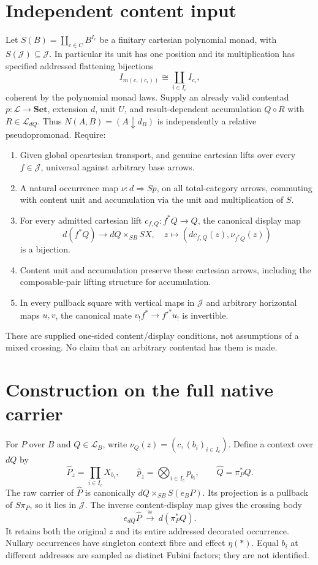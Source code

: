 \documentclass[11pt]{article}
\begin{document}
\section{Independent content input}
Let $S(B)=\coprod_{c\in C} B^{I_c}$ be a finitary cartesian polynomial monad, with $S(\mathcal J)\subseteq\mathcal J$. In particular its unit has one position and its multiplication has specified addressed flattening bijections
\[
 I_{m(c,(c_i))}\cong\coprod_{i\in I_c} I_{c_i},
\]
coherent by the polynomial monad laws. Supply an already valid contentad $p:\mathcal L\to\mathbf{Set}$, extension $d$, unit $U$, and result-dependent accumulation $Q\diamond R$ with $R\in\mathcal L_{dQ}$. Thus $N(A,B)=(A\downarrow d_B)$ is independently a relative pseudopromonad. Require:
\begin{enumerate}
\item Given global opcartesian transport, and genuine cartesian lifts over every $f\in\mathcal J$, universal against arbitrary base arrows.
\item A natural occurrence map $\nu:d\Rightarrow Sp$, on all total-category arrows, commuting with content unit and accumulation via the unit and multiplication of $S$.
\item For every admitted cartesian lift $c_{f,Q}:f^*Q\to Q$, the canonical display map
\[
 d(f^*Q)\longrightarrow dQ\times_{SB}SX,
 \quad z\mapsto(d c_{f,Q}(z),\nu_{f^*Q}(z))
\]
is a bijection.
\item Content unit and accumulation preserve these cartesian arrows, including the composable-pair lifting structure for accumulation.
\item In every pullback square with vertical maps in $\mathcal J$ and arbitrary horizontal maps $u,v$, the canonical mate $v_!f^*\to f'^*u_!$ is invertible.
\end{enumerate}
These are supplied one-sided content/display conditions, not assumptions of a mixed crossing. No claim that an arbitrary contentad has them is made.

\section{Construction on the full native carrier}
For $P$ over $B$ and $Q\in\mathcal L_B$, write $\nu_Q(z)=(c,(b_i)_{i\in I_c})$. Define a context over $dQ$ by
\[
 \widehat P_z=\prod_{i\in I_c} X_{b_i},\qquad
 \widehat p_z=\bigotimes_{i\in I_c}p_{b_i},\qquad
 \widehat Q=\pi_P^*Q.\tag{X}
\]
The raw carrier of $\widehat P$ is canonically $dQ\times_{SB}S(e_BP)$. Its projection is a pullback of $S\pi_P$, so it lies in $\mathcal J$. The inverse content-display map gives the crossing body
\[
 e_{dQ}\widehat P\ \xrightarrow{\cong}\ d(\pi_P^*Q).\tag{B}
\]
It retains both the original $z$ and its entire addressed decorated occurrence. Nullary occurrences have singleton context fibre and effect $\eta(*)$. Equal $b_i$ at different addresses are sampled as distinct Fubini factors; they are not identified.
\end{document}
